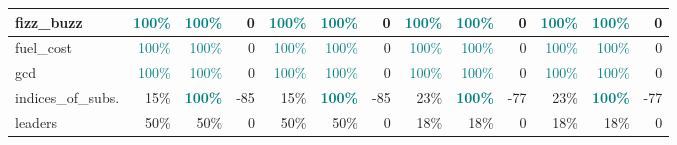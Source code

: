 \begin{table}[!h]
{\begin{tabular}{|p{2.9cm}|rr|r|rr|r||rr|r|rr|r|}
		fizz\_buzz         & \textcolor{teal}{100\%}              & \multicolumn{1}{r|}{\textcolor{teal}{100\%}}          & \cellcolor[HTML]{FFFFFF}0    & \textcolor{teal}{100\%}          & \multicolumn{1}{r|}{\textcolor{teal}{100\%}}          & \cellcolor[HTML]{FFFFFF}0    & \textcolor{teal}{100\%}              & \multicolumn{1}{r|}{\textcolor{teal}{100\%}} & \cellcolor[HTML]{FFFFFF}0    & \textcolor{teal}{100\%}          & \multicolumn{1}{r|}{\textcolor{teal}{100\%}}          & \cellcolor[HTML]{FFFFFF}0    \\ \hline
		fuel\_cost         & \textcolor{teal}{100\%}              & \multicolumn{1}{r|}{\textcolor{teal}{100\%}}          & \cellcolor[HTML]{FFFFFF}0    & \textcolor{teal}{100\%}          & \multicolumn{1}{r|}{\textcolor{teal}{100\%}}          & \cellcolor[HTML]{FFFFFF}0    & \textcolor{teal}{100\%}              & \multicolumn{1}{r|}{\textcolor{teal}{100\%}} & \cellcolor[HTML]{FFFFFF}0    & \textcolor{teal}{100\%}          & \multicolumn{1}{r|}{\textcolor{teal}{100\%}}          & \cellcolor[HTML]{FFFFFF}0    \\ \hline
		gcd                & \textcolor{teal}{100\%}              & \multicolumn{1}{r|}{\textcolor{teal}{100\%}}          & \cellcolor[HTML]{FFFFFF}0    & \textcolor{teal}{100\%}          & \multicolumn{1}{r|}{\textcolor{teal}{100\%}}          & \cellcolor[HTML]{FFFFFF}0    & \textcolor{teal}{100\%}              & \multicolumn{1}{r|}{\textcolor{teal}{100\%}} & \cellcolor[HTML]{FFFFFF}0    & \textcolor{teal}{100\%}          & \multicolumn{1}{r|}{\textcolor{teal}{100\%}}          & \cellcolor[HTML]{FFFFFF}0    \\ \hline
		indices\_of\_subs. & 15\%                                 & \multicolumn{1}{r|}{\textcolor{teal}{\textbf{100\%}}} & \cellcolor[HTML]{6598EB}-85  & 15\%                             & \multicolumn{1}{r|}{\textcolor{teal}{\textbf{100\%}}} & \cellcolor[HTML]{6598EB}-85  & 23\%                                 & \multicolumn{1}{r|}{\textcolor{teal}{\textbf{100\%}}} & \cellcolor[HTML]{73A1ED}-77  & 23\%                             & \multicolumn{1}{r|}{\textcolor{teal}{\textbf{100\%}}} & \cellcolor[HTML]{73A1ED}-77  \\ \hline
		leaders            & 50\%                                 & \multicolumn{1}{r|}{50\%}                             & \cellcolor[HTML]{FFFFFF}0    & 50\%                             & \multicolumn{1}{r|}{50\%}                             & \cellcolor[HTML]{FFFFFF}0    & 18\%                                 & \multicolumn{1}{r|}{18\%}                    & \cellcolor[HTML]{FFFFFF}0    & 18\%                             & \multicolumn{1}{r|}{18\%}                             & \cellcolor[HTML]{FFFFFF}0    \\ \hline

\end{tabular}}
\end{table}
